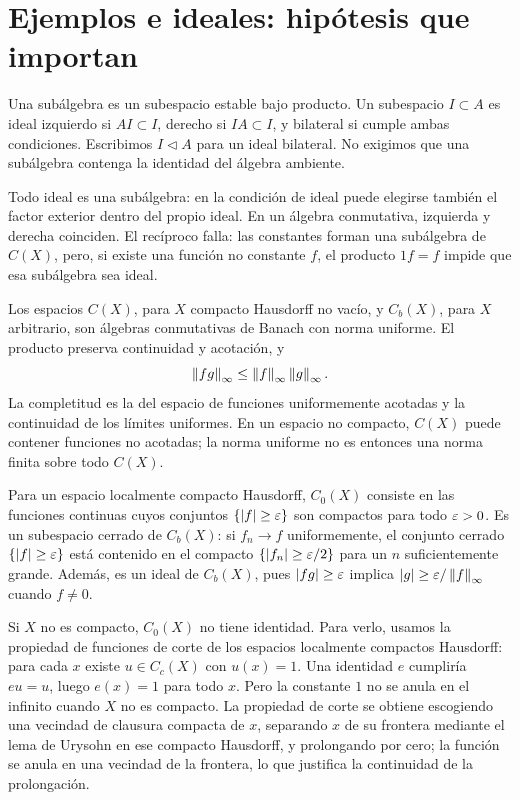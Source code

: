 \section{Ejemplos e ideales: hipótesis que importan}

\begin{definicion}
Una subálgebra es un subespacio estable bajo producto. Un subespacio $I\subset A$ es ideal izquierdo si $AI\subset I$, derecho si $IA\subset I$, y bilateral si cumple ambas condiciones. Escribimos $I\mathrel{\triangleleft}A$ para un ideal bilateral. No exigimos que una subálgebra contenga la identidad del álgebra ambiente.
\end{definicion}

Todo ideal es una subálgebra: en la condición de ideal puede elegirse también el factor exterior dentro del propio ideal. En un álgebra conmutativa, izquierda y derecha coinciden. El recíproco falla: las constantes forman una subálgebra de $C(X)$, pero, si existe una función no constante $f$, el producto $1f=f$ impide que esa subálgebra sea ideal.

Los espacios $C(X)$, para $X$ compacto Hausdorff no vacío, y $C_b(X)$, para $X$ arbitrario, son álgebras conmutativas de Banach con norma uniforme. El producto preserva continuidad y acotación, y
\[
 \left\lVert fg\right\rVert_\infty\leq\left\lVert f\right\rVert_\infty\left\lVert g\right\rVert_\infty.
\]
La completitud es la del espacio de funciones uniformemente acotadas y la continuidad de los límites uniformes. En un espacio no compacto, $C(X)$ puede contener funciones no acotadas; la norma uniforme no es entonces una norma finita sobre todo $C(X)$.

Para un espacio localmente compacto Hausdorff, $C_0(X)$ consiste en las funciones continuas cuyos conjuntos $\{|f|\geq\varepsilon\}$ son compactos para todo $\varepsilon>0$. Es un subespacio cerrado de $C_b(X)$: si $f_n\to f$ uniformemente, el conjunto cerrado $\{|f|\geq\varepsilon\}$ está contenido en el compacto $\{|f_n|\geq\varepsilon/2\}$ para un $n$ suficientemente grande. Además, es un ideal de $C_b(X)$, pues $|fg|\geq\varepsilon$ implica $|g|\geq\varepsilon/\left\lVert f\right\rVert_\infty$ cuando $f\ne0$.

Si $X$ no es compacto, $C_0(X)$ no tiene identidad. Para verlo, usamos la propiedad de funciones de corte de los espacios localmente compactos Hausdorff: para cada $x$ existe $u\in C_c(X)$ con $u(x)=1$. Una identidad $e$ cumpliría $eu=u$, luego $e(x)=1$ para todo $x$. Pero la constante $1$ no se anula en el infinito cuando $X$ no es compacto. La propiedad de corte se obtiene escogiendo una vecindad de clausura compacta de $x$, separando $x$ de su frontera mediante el lema de Urysohn en ese compacto Hausdorff, y prolongando por cero; la función se anula en una vecindad de la frontera, lo que justifica la continuidad de la prolongación.

